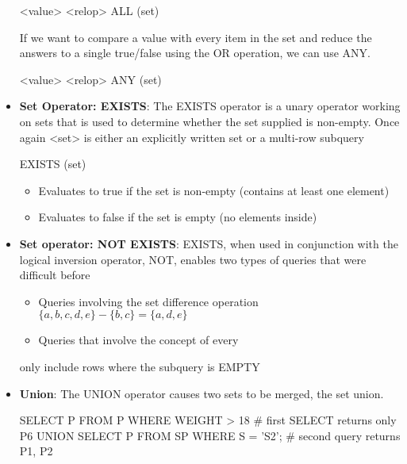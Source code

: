 \documentclass{report}
\begin{document}
\begin{itemize}
            \bigbreak \noindent 
            \begin{sqlcode}
            <value> <relop> ALL (set)
            \end{sqlcode}
            \bigbreak \noindent 
            If we want to compare a value with every item in the set and reduce the answers to a single true/false using the OR operation, we can use ANY.
            \bigbreak \noindent 
            \begin{sqlcode}
            <value> <relop> ANY (set)
            \end{sqlcode}
        \item \textbf{Set Operator: EXISTS}: The EXISTS operator is a unary operator working on sets that is used to determine whether the set supplied is non-empty. Once again <set> is either an explicitly written set or a multi-row subquery
            \bigbreak \noindent 
            \begin{sqlcode}
            EXISTS (set)
            \end{sqlcode}
            \begin{itemize}
                \item Evaluates to true if the set is non-empty (contains at least one element)
                \item Evaluates to false if the set is empty (no elements inside)
            \end{itemize}
        \item \textbf{Set operator: NOT EXISTS}: EXISTS, when used in conjunction with the logical inversion operator, NOT, enables two types of queries that were difficult before
            \begin{itemize}
                \item Queries involving the set difference operation $\{a,b,c,d,e\} - \{b,c\} = \{a,d,e\}$
                \item Queries that involve the concept of every
            \end{itemize}
            \bigbreak \noindent 
            only include rows where the subquery is EMPTY
        \item \textbf{Union}: The UNION operator causes two sets to be merged, the set union.
            \bigbreak \noindent 
            \begin{sqlcode}
                SELECT P
                    FROM P
                    WHERE WEIGHT > 18 # first SELECT returns only P6
                UNION
                    SELECT P
                    FROM SP
                    WHERE S = 'S2'; # second query returns P1, P2

\end{sqlcode}
\end{itemize}
\end{document}
